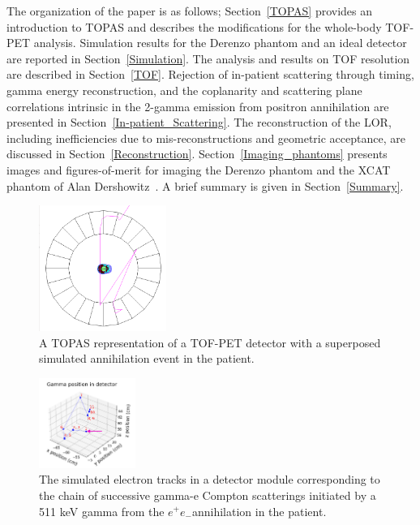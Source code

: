 \documentclass[12pt]{article}
\def\epem{$e^{+} e_{-}$}
\begin{document}
 The organization of the paper is as
follows; Section~\ref{TOPAS} provides an introduction to TOPAS and
describes the modifications for the whole-body TOF-PET analysis.
Simulation results for the Derenzo phantom and an ideal detector are
reported in Section~\ref{Simulation}. The analysis and results on TOF
resolution are described in Section~\ref{TOF}. Rejection of in-patient
scattering through timing, gamma energy reconstruction, and the
coplanarity and scattering plane correlations intrinsic in the 2-gamma
emission from positron annihilation are presented in
Section~\ref{In-patient_Scattering}. The reconstruction of the LOR, including
inefficiencies due to mis-reconstructions and geometric
acceptance, are discussed in Section~\ref{Reconstruction}.
Section~\ref{Imaging_phantoms} presents images and figures-of-merit for imaging
the Derenzo phantom and the  XCAT phantom of Alan
Dershowitz~\cite{Dershowitz_phantom}. A brief summary is given in
Section~\ref{Summary}.

\begin{figure}[!ht]
	\centering
	\includegraphics[angle=0,width=0.37\textwidth]{Figures/brain-gammas-figure-inverted-v1a.png}
	\caption{A TOPAS representation of a TOF-PET detector with a
	  superposed simulated annihilation event in the patient.}
	\label{fig:Detector_and_Gamma}
\end{figure}

\begin{figure}[ht]
	\centering
	\includegraphics[angle=0,width=0.28\textwidth]{Figures/gamma-scatter-figure-v1a.png}
	\caption{The simulated electron tracks in a detector module corresponding to
 the chain of successive gamma-e Compton scatterings initiated by a
 511 keV gamma from the \epem annihilation in the patient.}
	\label{fig:Detector_Module}
\end{figure}
\end{document}
